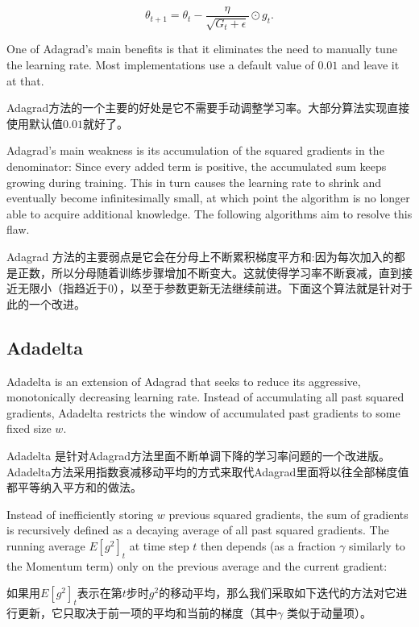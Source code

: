 \documentclass{article}
\begin{document}
\begin{equation}
\theta_{t+1} = \theta_{t} - \frac{\eta}{\sqrt{G_{t} + \epsilon}} \odot g_{t}.
\end{equation}

One of Adagrad's main benefits is that it eliminates the need to manually tune the learning rate. Most implementations use a default value of $0.01$ and leave it at that.

Adagrad方法的一个主要的好处是它不需要手动调整学习率。大部分算法实现直接使用默认值$0.01$就好了。

Adagrad's main weakness is its accumulation of the squared gradients in the denominator: Since every added term is positive, the accumulated sum keeps growing during training. This in turn causes the learning rate to shrink and eventually become infinitesimally small, at which point the algorithm is no longer able to acquire additional knowledge. The following algorithms aim to resolve this flaw.

Adagrad 方法的主要弱点是它会在分母上不断累积梯度平方和:因为每次加入的都是正数，所以分母随着训练步骤增加不断变大。这就使得学习率不断衰减，直到接近无限小（指趋近于0），以至于参数更新无法继续前进。下面这个算法就是针对于此的一个改进。

\subsection{Adadelta}

Adadelta \cite{Zeiler2012} is an extension of Adagrad that seeks to reduce its aggressive, monotonically decreasing learning rate. Instead of accumulating all past squared gradients, Adadelta restricts the window of accumulated past gradients to some fixed size $w$.

Adadelta \cite{Zeiler2012} 是针对Adagrad方法里面不断单调下降的学习率问题的一个改进版。Adadelta方法采用指数衰减移动平均的方式来取代Adagrad里面将以往全部梯度值都平等纳入平方和的做法。

Instead of inefficiently storing $w$ previous squared gradients, the sum of gradients is recursively defined as a decaying average of all past squared gradients. The running average $E[g^2]_t$ at time step $t$ then depends (as a fraction $\gamma $ similarly to the Momentum term) only on the previous average and the current gradient:

如果用$E[g^2]_t$表示在第$t$步时$g^2$的移动平均，那么我们采取如下迭代的方法对它进行更新，它只取决于前一项的平均和当前的梯度（其中$\gamma $ 类似于动量项）。
\end{document}

